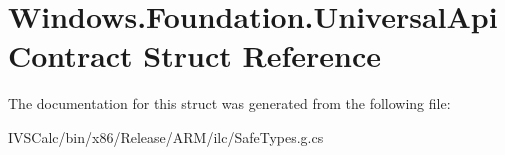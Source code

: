 \hypertarget{struct_windows_1_1_foundation_1_1_universal_api_contract}{}\section{Windows.\+Foundation.\+Universal\+Api\+Contract Struct Reference}
\label{struct_windows_1_1_foundation_1_1_universal_api_contract}


The documentation for this struct was generated from the following file\+:\begin{DoxyCompactItemize}
\item 
I\+V\+S\+Calc/bin/x86/\+Release/\+A\+R\+M/ilc/Safe\+Types.\+g.\+cs\end{DoxyCompactItemize}
